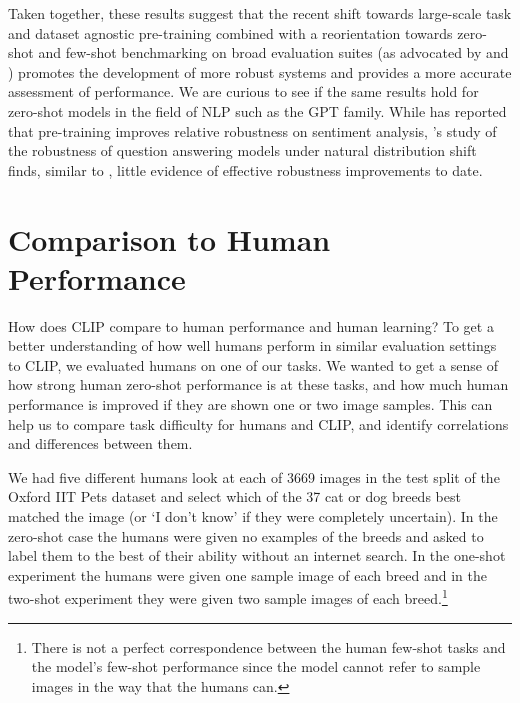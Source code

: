\documentclass{article}
\begin{document}
Taken together, these results suggest that the recent shift towards large-scale task and dataset agnostic pre-training combined with a reorientation towards zero-shot and few-shot benchmarking on broad evaluation suites (as advocated by \citet{yogatama2019learning} and \citet{linzen2020can}) promotes the development of more robust systems and provides a more accurate assessment of performance. We are curious to see if the same results hold for zero-shot models in the field of NLP such as the GPT family. While \citet{hendrycks2020pretrained} has reported that pre-training improves relative robustness on sentiment analysis, \citet{miller2020effect}'s study of the robustness of question answering models under natural distribution shift finds, similar to \citet{taori2020measuring}, little evidence of effective robustness improvements to date.


















\section{Comparison to Human Performance}
\label{section:human_comparison}


How does CLIP compare to human performance and human learning? To get a better understanding of how well humans perform in similar evaluation settings to CLIP, we evaluated humans on one of our tasks. We wanted to get a sense of how strong human zero-shot performance is at these tasks, and how much human performance is improved if they are shown one or two image samples. This can help us to compare task difficulty for humans and CLIP, and identify correlations and differences between them.

We had five different humans look at each of 3669 images in the test split of the Oxford IIT Pets dataset \citep{parkhi12a} and select which of the 37 cat or dog breeds best matched the image (or `I don’t know' if they were completely uncertain). In the zero-shot case the humans were given no examples of the breeds and asked to label them to the best of their ability without an internet search. In the one-shot experiment the humans were given one sample image of each breed and in the two-shot experiment they were given two sample images of each breed.\footnote{There is not a perfect correspondence between the human few-shot tasks and the model's few-shot performance since the model cannot refer to sample images in the way that the humans can.}
\end{document}
